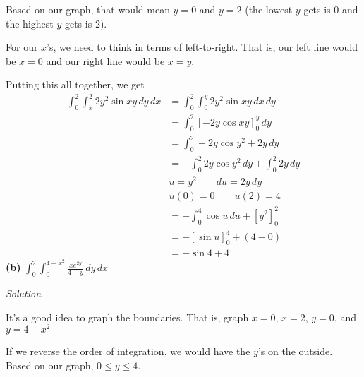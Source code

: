 \documentclass{article}
\newcommand{\lrb}[1]{\left[ #1 \right]}
\newcommand{\Solution}{\textit{Solution}}
\begin{document}
Based on our graph, that would mean $y=0$ and $y=2$ (the lowest $y$ gets is $0$ and the highest $y$ gets is $2$).

For our $x$'s, we need to think in terms of left-to-right. That is, our left line would be $x=0$ and our right line would be $x=y$.

Putting this all together, we get
\begin{align*}
    \int_0^2\int_x^2 2y^2\sin xy\,dy\,dx&=\int_0^2\int_0^y 2y^2\sin xy \,dx\,dy\\
    &=\int_0^2\lrb{-2y\cos xy}_0^y\,dy\\
    &=\int_0^2 -2y\cos y^2 + 2y\,dy\\
    &=-\int_0^2 2y\cos y^2\,dy + \int_0^2 2y\,dy\\
    &u=y^2\hspace{2em}du=2y\,dy\\
    &u(0)=0\hspace{2em}u(2)=4\\
    &=-\int_0^4 \cos u\,du+\lrb{y^2}_0^2\\
    &=-\lrb{\sin u}_0^4 + (4-0)\\
    &=\boxed{-\sin 4 + 4}
\end{align*}
\textbf{(b)} $\displaystyle \int_0^2\int_0^{4-x^2}\frac{xe^{2y}}{4-y}\,dy\,dx$

\Solution

It's a good idea to graph the boundaries. That is, graph $x=0$, $x=2$, $y=0$, and $y=4-x^2$
\begin{center}
\end{center}

If we reverse the order of integration, we would have the $y$'s on the outside. 
Based on our graph, $0\leq y \leq 4$.
\end{document}
